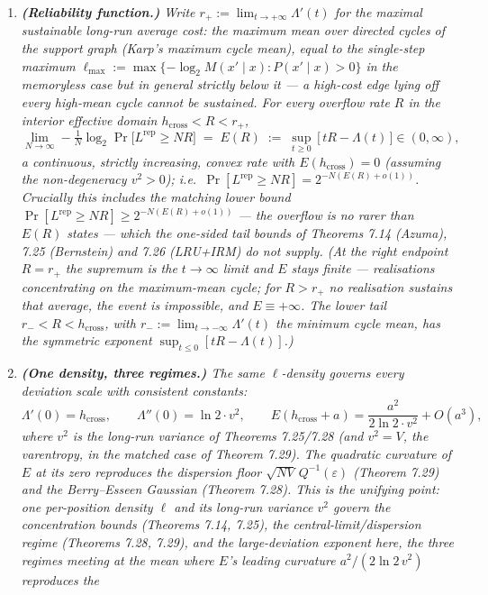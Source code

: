 \documentclass[
]{article}
\begin{document}
\begin{enumerate}
\item \emph{\textbf{(Reliability function.)} Write $r_+:=\lim_{t\to+\infty}\Lambda'(t)$
for the maximal \emph{sustainable} long-run average cost: the maximum mean over
directed cycles of the support graph (Karp's maximum cycle mean), equal to the
single-step maximum $\ell_{\max}:=\max\{-\log_2 M(x'\mid x):P(x'\mid x)>0\}$ in the
memoryless case but in general strictly below it --- a high-cost edge lying off every
high-mean cycle cannot be sustained. For every overflow rate $R$ in the interior
effective domain $h_{\mathrm{cross}}<R<r_+$,}
\[
  \lim_{N\to\infty}-\tfrac1N\log_2\Pr\!\bigl[L^{\mathrm{rep}}\ge NR\bigr]
  \;=\; E(R)\;:=\;\sup_{t\ge0}\,\bigl[\,tR-\Lambda(t)\,\bigr]\in(0,\infty),
\]
\emph{a continuous, strictly increasing, convex rate with $E(h_{\mathrm{cross}})=0$
(assuming the non-degeneracy $v^2>0$); i.e.\
$\Pr[L^{\mathrm{rep}}\ge NR]=2^{-N(E(R)+o(1))}$. Crucially this includes the
matching \emph{lower} bound $\Pr[L^{\mathrm{rep}}\ge NR]\ge 2^{-N(E(R)+o(1))}$ ---
the overflow is no rarer than $E(R)$ states --- which the one-sided tail bounds
of Theorems 7.14 (Azuma), 7.25 (Bernstein) and 7.26 (LRU+IRM) do \emph{not}
supply. (At the right endpoint $R=r_+$ the supremum is the $t\to\infty$ limit and
$E$ stays finite --- realisations concentrating on the maximum-mean cycle; for
$R>r_+$ no realisation sustains that average, the event is impossible, and
$E\equiv+\infty$. The lower tail $r_-<R<h_{\mathrm{cross}}$, with
$r_-:=\lim_{t\to-\infty}\Lambda'(t)$ the minimum cycle mean, has the symmetric
exponent $\sup_{t\le0}[tR-\Lambda(t)]$.)}
\item \emph{\textbf{(One density, three regimes.)} The same $\ell$-density governs
every deviation scale with consistent constants:}
\[
  \Lambda'(0)=h_{\mathrm{cross}},\qquad
  \Lambda''(0)=\ln2\cdot v^2,\qquad
  E(h_{\mathrm{cross}}+a)=\frac{a^2}{2\ln2\cdot v^2}+O(a^3),
\]
\emph{where $v^2$ is the long-run variance of Theorems 7.25/7.28 (and $v^2=V$, the
varentropy, in the matched case of Theorem 7.29). The quadratic curvature of $E$
at its zero \emph{reproduces} the dispersion floor $\sqrt{NV}\,Q^{-1}(\varepsilon)$
(Theorem 7.29) and the Berry--Esseen Gaussian (Theorem 7.28). This is the unifying
point: one per-position density $\ell$ and its long-run variance $v^2$ govern the
concentration bounds (Theorems 7.14, 7.25), the central-limit/dispersion regime
(Theorems 7.28, 7.29), and the large-deviation exponent here, the three regimes
meeting at the mean where $E$'s leading curvature $a^2/(2\ln2\,v^2)$ reproduces the
}
\end{enumerate}
\end{document}
